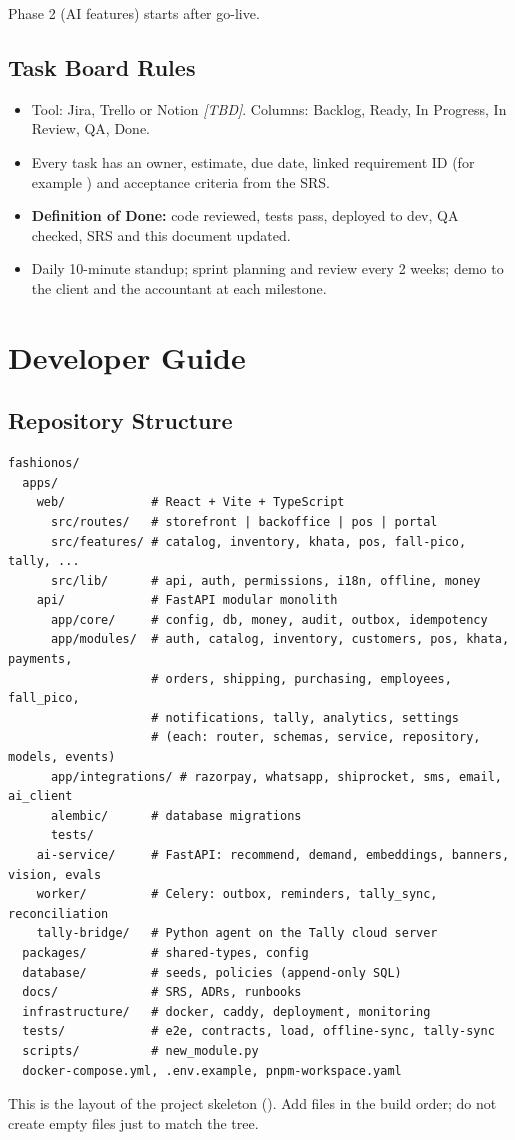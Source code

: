 \documentclass[11pt,a4paper]{article}
\newcommand{\code}[1]{\texttt{\detokenize{#1}}}
\newcommand{\tbd}{\textit{[TBD]}}
\newcommand{\req}[1]{\texttt{\detokenize{#1}}}
\begin{document}
Phase 2 (AI features) starts after go-live.

\subsection{Task Board Rules}
\begin{itemize}
\item Tool: Jira, Trello or Notion \tbd. Columns: Backlog, Ready, In Progress, In Review, QA, Done.
\item Every task has an owner, estimate, due date, linked requirement ID (for example \req{FR-KHT-02}) and acceptance criteria from the SRS.
\item \textbf{Definition of Done:} code reviewed, tests pass, deployed to dev, QA checked, SRS and this document updated.
\item Daily 10-minute standup; sprint planning and review every 2 weeks; demo to the client and the accountant at each milestone.
\end{itemize}

\section{Developer Guide}
\subsection{Repository Structure}
\begin{lstlisting}
fashionos/
  apps/
    web/            # React + Vite + TypeScript
      src/routes/   # storefront | backoffice | pos | portal
      src/features/ # catalog, inventory, khata, pos, fall-pico, tally, ...
      src/lib/      # api, auth, permissions, i18n, offline, money
    api/            # FastAPI modular monolith
      app/core/     # config, db, money, audit, outbox, idempotency
      app/modules/  # auth, catalog, inventory, customers, pos, khata, payments,
                    # orders, shipping, purchasing, employees, fall_pico,
                    # notifications, tally, analytics, settings
                    # (each: router, schemas, service, repository, models, events)
      app/integrations/ # razorpay, whatsapp, shiprocket, sms, email, ai_client
      alembic/      # database migrations
      tests/
    ai-service/     # FastAPI: recommend, demand, embeddings, banners, vision, evals
    worker/         # Celery: outbox, reminders, tally_sync, reconciliation
    tally-bridge/   # Python agent on the Tally cloud server
  packages/         # shared-types, config
  database/         # seeds, policies (append-only SQL)
  docs/             # SRS, ADRs, runbooks
  infrastructure/   # docker, caddy, deployment, monitoring
  tests/            # e2e, contracts, load, offline-sync, tally-sync
  scripts/          # new_module.py
  docker-compose.yml, .env.example, pnpm-workspace.yaml
\end{lstlisting}
This is the layout of the project skeleton (\code{FashionOS_project_skeleton.zip}). Add files in the build order; do not create empty files just to match the tree.
\end{document}
